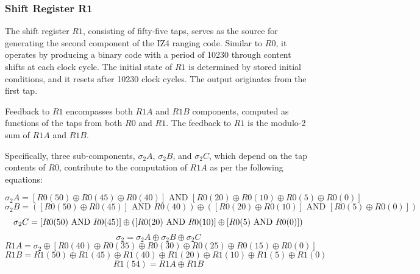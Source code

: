 \subsubsection{Shift Register R1}

\noindent The shift register \(R1\), consisting of fifty-five taps, serves as the source for generating the second component of the IZ4 ranging code. Similar to \(R0\), it operates by producing a binary code with a period of 10230 through content shifts at each clock cycle. The initial state of \(R1\) is determined by stored initial conditions, and it resets after 10230 clock cycles. The output originates from the first tap.

\noindent Feedback to \(R1\) encompasses both \(R1A\) and \(R1B\) components, computed as functions of the taps from both \(R0\) and \(R1\). The feedback to \(R1\) is the modulo-2 sum of \(R1A\) and \(R1B\).

Specifically, three sub-components, \(\sigma_2A\), \(\sigma_2B\), and \(\sigma_2C\), which depend on the tap contents of \(R0\), contribute to the computation of \(R1A\) as per the following equations:

\begin{equation}
\sigma_2A = [R0(50) \oplus R0(45) \oplus R0(40)] \text{ AND } [R0(20) \oplus R0(10) \oplus R0(5) \oplus R0(0)] 
\label{eq:sigma_2A } 
\end{equation}
\begin{equation}
\sigma_2B = ([R0(50) \oplus R0(45)] \text{ AND } R0(40)) \oplus  ([R0(20) \oplus R0(10)] \text{ AND }[R0(5) \oplus R0(0)]) 
\label{eq:sigma_2B } 
\end{equation}
\begin{equation}
\label{eq:sigma_2c} 
\sigma_2C = [R0(50) \text{ AND } R0(45)] \oplus ([R0(20) \text{ AND } \\ R0(10)]\oplus  [R0(5) \text{ AND }R0(0)])  
\end{equation}
\begin{equation}
\label{eq:sigma_2} 
\sigma_2 = \sigma_2A \oplus \sigma_2B \oplus \sigma_2C
\end{equation}
\begin{equation}
\label{eq:R1A} 
R1A = \sigma_2 \oplus [R0(40) \oplus R0(35) \oplus R0(30) \oplus R0(25) \oplus R0(15) \oplus R0(0)]
\end{equation}
\begin{equation}
\label{eq:R1B} 
R1B = R1(50) \oplus R1(45) \oplus R1(40) \oplus R1(20) \oplus R1(10) \oplus R1(5) \oplus R1(0)
\end{equation}
\begin{equation}
\label{eq:R154} 
R1(54) = R1A \oplus R1B
\end{equation}

